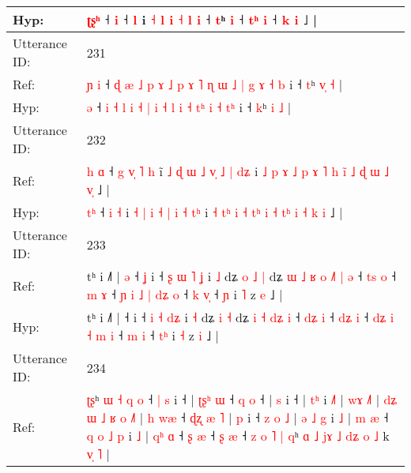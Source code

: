 \documentclass[10pt]{article}
\DeclareRobustCommand{\hl}[1]{{\textcolor{red}{#1}}}
\begin{document}
\begin{longtable}{ll}
 \\
Hyp: & \hl{}\hl{ʈ}\hl{ʂ}\hl{ʰ} ˧\hl{}\hl{} \hl{i} ˧\hl{}\hl{}\hl{}\hl{}\hl{}\hl{} \hl{l} i\hl{}\hl{}\hl{} \hl{}\hl{˧} \hl{l} \hl{i} \hl{˧} \hl{l} \hl{}\hl{i} ˧ \hl{t}ʰ \hl{i} ˧ \hl{t}\hl{ʰ} \hl{i} ˧\hl{}\hl{}\hl{} \hl{}\hl{k} \hl{i} ˩ |
 \\
\midrule
Utterance ID: & 231 \\
Ref: & \hl{ɲ}\hl{ }\hl{i} ˧ \hl{ɖ} \hl{æ} \hl{˩} \hl{p} \hl{ɤ} \hl{˩} \hl{p} \hl{ɤ} \hl{˥} \hl{ɳ} \hl{ɯ} \hl{˩}\hl{ }\hl{|} \hl{g} \hl{ɤ} \hl{˧}\hl{ }\hl{b} i ˧ \hl{t}ʰ \hl{v}\hl{̩} \hl{˧} |
 \\
Hyp: & \hl{}\hl{}\hl{ə} ˧ \hl{i} \hl{˧} \hl{l} \hl{i} \hl{˧} \hl{|} \hl{i} \hl{˧} \hl{l} \hl{i} \hl{˧} \hl{}\hl{t}\hl{ʰ} \hl{i} \hl{˧} \hl{}\hl{t}\hl{ʰ} i ˧ \hl{k}ʰ \hl{}\hl{i} \hl{˩} |
 \\
\midrule
Utterance ID: & 232 \\
Ref: & \hl{h}\hl{ }\hl{ɑ} ˧\hl{ }\hl{g}\hl{ }\hl{v}\hl{̩} \hl{˥} \hl{h} i\hl{̃} \hl{˩} \hl{ɖ} \hl{ɯ} \hl{˩} \hl{v}\hl{̩} \hl{˩} \hl{|} \hl{d}\hl{ʑ} i \hl{˩} \hl{p}\hl{ }\hl{ɤ} \hl{˩} \hl{p} \hl{ɤ}\hl{ }\hl{˥} \hl{h} \hl{i}\hl{̃}\hl{ }\hl{˩} \hl{ɖ} \hl{ɯ} \hl{˩} \hl{v}\hl{̩} ˩ |
 \\
Hyp: & \hl{}\hl{t}\hl{ʰ} ˧\hl{}\hl{}\hl{}\hl{}\hl{} \hl{i} \hl{˧} i\hl{} \hl{˧} \hl{|} \hl{i} \hl{˧} \hl{}\hl{|} \hl{i} \hl{˧} \hl{t}\hl{ʰ} i \hl{˧} \hl{}\hl{t}\hl{ʰ} \hl{i} \hl{˧} \hl{}\hl{t}\hl{ʰ} \hl{i} \hl{˧}\hl{ }\hl{t}\hl{ʰ} \hl{i} \hl{˧} \hl{k} \hl{}\hl{i} ˩ |
 \\
\midrule
Utterance ID: & 233 \\
Ref: & tʰ i ˩˥ |\hl{ }\hl{ə} ˧\hl{ }\hl{ʝ} i ˧ \hl{ʂ} \hl{ɯ} \hl{˥}\hl{ }\hl{ʝ} i \hl{˩} dʑ\hl{ }\hl{o} \hl{˩} \hl{|} dʑ\hl{ }\hl{ɯ}\hl{ }\hl{˩} \hl{ʁ} \hl{o} \hl{˩}\hl{˥}\hl{ }\hl{|} \hl{ə} ˧ \hl{t}\hl{s} \hl{o} ˧ \hl{}\hl{m} \hl{ɤ} ˧ \hl{ɲ}\hl{ }\hl{i} \hl{˩} \hl{|} \hl{d}\hl{ʑ} \hl{o} ˧ \hl{k} \hl{v}\hl{̩} ˧ \hl{}\hl{ɲ} i \hl{˥} z \hl{e} ˩ |
 \\
Hyp: & tʰ i ˩˥ |\hl{}\hl{} ˧\hl{}\hl{} i ˧ \hl{i} \hl{˧} \hl{}\hl{d}\hl{ʑ} i \hl{˧} dʑ\hl{}\hl{} \hl{i} \hl{˧} dʑ\hl{}\hl{}\hl{}\hl{} \hl{i} \hl{˧} \hl{}\hl{}\hl{d}\hl{ʑ} \hl{i} ˧ \hl{d}\hl{ʑ} \hl{i} ˧ \hl{d}\hl{ʑ} \hl{i} ˧ \hl{}\hl{d}\hl{ʑ} \hl{i} \hl{˧} \hl{}\hl{m} \hl{i} ˧ \hl{m} \hl{}\hl{i} ˧ \hl{t}\hl{ʰ} i \hl{˧} z \hl{i} ˩ |
 \\
\midrule
Utterance ID: & 234 \\
Ref: & \hl{ʈ}\hl{ʂ}ʰ \hl{ɯ} \hl{˧}\hl{ }\hl{q} \hl{o} ˧ \hl{|} \hl{s} i ˧ |\hl{ }\hl{ʈ}\hl{ʂ}\hl{ʰ} \hl{ɯ} ˧ \hl{q} \hl{o} ˧ |\hl{ }\hl{s} i ˧ |\hl{ }\hl{t}\hl{ʰ} i \hl{˩}\hl{˥} | \hl{w}\hl{ɤ} \hl{˩}\hl{˥} |\hl{ }\hl{d}\hl{ʑ}\hl{ }\hl{ɯ}\hl{ }\hl{˩}\hl{ }\hl{ʁ} \hl{o} \hl{˩}\hl{˥} |\hl{ }\hl{h} \hl{w}\hl{æ} ˧\hl{ }\hl{ɖ}\hl{ʐ}\hl{ }\hl{æ}\hl{ }\hl{˥} |\hl{ }\hl{p} i ˧\hl{ }\hl{z}\hl{ }\hl{o}\hl{ }\hl{˩} |\hl{ }\hl{ə}\hl{ }\hl{˩}\hl{ }\hl{g} i \hl{˩} |\hl{ }\hl{m} \hl{æ} ˧ \hl{q} \hl{o} \hl{˩} \hl{p} i \hl{˩} |\hl{ }\hl{q}\hl{ʰ} \hl{ɑ} ˧ \hl{ʂ} \hl{æ} ˧ \hl{ʂ} \hl{æ} ˧\hl{ }\hl{z} \hl{o} \hl{˥} \hl{|} \hl{q}ʰ\hl{ }\hl{ɑ}\hl{ }\hl{˩} \hl{j}\hl{ɤ} \hl{˩} \hl{d}\hl{ʑ} \hl{o} \hl{˩} k \hl{v}\hl{̩} \hl{˥} |

\end{longtable}
\end{document}
